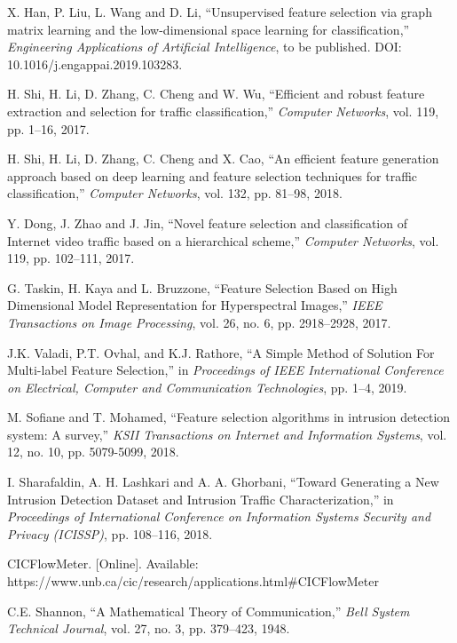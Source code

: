\documentclass{ieeeaccess}
\theoremstyle{definition}
\begin{document}
\begin{thebibliography}{00}
    X. Han, P. Liu, L. Wang and D. Li, ``Unsupervised feature selection via graph matrix learning and the low-dimensional space learning for classification,'' \emph{Engineering Applications of Artificial Intelligence}, to be published. DOI: 10.1016/j.engappai.2019.103283.

    H. Shi, H. Li, D. Zhang, C. Cheng and W. Wu, ``Efficient and robust feature extraction and selection for traffic classification,'' \emph{Computer Networks}, vol. 119, pp. 1--16, 2017.

    H. Shi, H. Li, D. Zhang, C. Cheng and X. Cao, ``An efficient feature generation approach based on deep learning and feature selection techniques for traffic classification,'' \emph{Computer Networks}, vol. 132, pp. 81--98, 2018.

    Y. Dong, J. Zhao and J. Jin, ``Novel feature selection and  classification of Internet video traffic based on a hierarchical scheme,'' \emph{Computer Networks}, vol. 119, pp. 102--111, 2017.

    G. Taskin, H. Kaya and L. Bruzzone, ``Feature Selection Based on High Dimensional Model Representation for Hyperspectral Images,'' \emph{IEEE Transactions on Image Processing}, vol. 26, no. 6, pp. 2918--2928, 2017.

    J.K. Valadi, P.T. Ovhal, and K.J. Rathore, ``A Simple Method of Solution For Multi-label Feature Selection,'' in \emph{Proceedings of IEEE International Conference on Electrical, Computer and Communication Technologies}, pp. 1--4, 2019.

    M. Sofiane and T. Mohamed, ``Feature selection algorithms in intrusion detection system: A survey,'' \emph{KSII Transactions on Internet and Information Systems}, vol. 12, no. 10, pp. 5079-5099, 2018.

    I. Sharafaldin, A. H. Lashkari and A. A. Ghorbani, ``Toward Generating a New Intrusion Detection Dataset and Intrusion Traffic Characterization,'' in \emph{Proceedings of International Conference on Information Systems Security and Privacy (ICISSP)}, pp. 108--116, 2018.

    CICFlowMeter. [Online]. Available: \\ https://www.unb.ca/cic/research/applications.html\#CICFlowMeter

    C.E. Shannon, ``A Mathematical Theory of Communication,'' \emph{Bell System Technical Journal}, vol. 27, no. 3, pp. 379--423, 1948.


\end{thebibliography}
\end{document}
